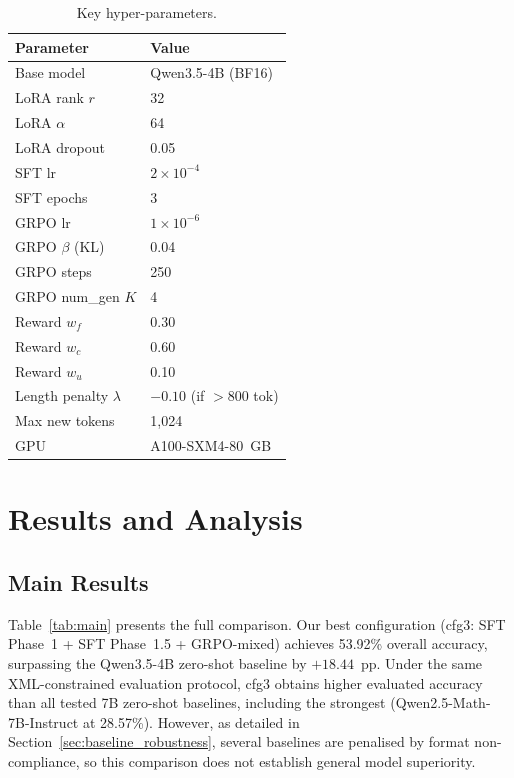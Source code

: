 \documentclass[cmc,journal,article,submit,moreauthors,pdftex]{Definitions/tsp}
\newcommand{\basemodelname}{Qwen3.5-4B}
\begin{document}
\begin{table}[H]
  \tablesize{\footnotesize}
  \caption{Key hyper-parameters.}
  \label{tab:hyperparams}
  \begin{tabularx}{\textwidth}{CC}
    \toprule
    \textbf{Parameter} & \textbf{Value} \\
    \midrule
    Base model         & \basemodelname{} (BF16) \\
    LoRA rank $r$      & 32 \\
    LoRA $\alpha$      & 64 \\
    LoRA dropout       & 0.05 \\
    SFT lr             & $2\times10^{-4}$ \\
    SFT epochs         & 3 \\
    GRPO lr            & $1\times10^{-6}$ \\
    GRPO $\beta$ (KL)  & 0.04 \\
    GRPO steps         & 250 \\
    GRPO num\_gen $K$  & 4 \\
    Reward $w_f$       & 0.30 \\
    Reward $w_c$       & 0.60 \\
    Reward $w_u$       & 0.10 \\
    Length penalty $\lambda$ & $-0.10$ (if $>$800 tok) \\
    Max new tokens     & 1,024 \\
    GPU                & A100-SXM4-80~GB \\
    \bottomrule
  \end{tabularx}
\end{table}

\section{Results and Analysis}\label{sec:results}

\subsection{Main Results}

Table~\ref{tab:main} presents the full comparison.
Our best configuration (cfg3: SFT Phase~1 + SFT Phase~1.5 + GRPO-mixed)
achieves 53.92\% overall accuracy, surpassing the
\basemodelname{} zero-shot baseline by $+18.44$~pp.
Under the same XML-constrained evaluation protocol, cfg3 obtains higher
evaluated accuracy than all tested 7B zero-shot baselines, including the
strongest (Qwen2.5-Math-7B-Instruct at 28.57\%).
However, as detailed in Section~\ref{sec:baseline_robustness}, several
baselines are penalised by format non-compliance, so this comparison
does not establish general model superiority.
\end{document}
